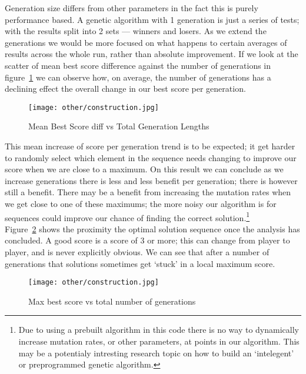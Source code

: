 Generation size differs from other parameters in the fact this is purely performance based.
A genetic algorithm with 1 generation is just a series of tests; with the results split into 2 sets --- winners and losers.
As we extend the generations we would be more focused on what happens to certain averages of results across the whole run, rather than absolute improvement.
If we look at the scatter of mean best score difference against the number of generations in figure~\ref{fig:GENS-mean-bs-diff-v-gens-all} we can observe how, on average, the number of generations has a declining effect the overall change in our best score per generation.\\ 

\begin{figure}
    \texttt{[image: other/construction.jpg]}
    \caption{Mean Best Score diff vs Total Generation Lengths}\label{fig:GENS-mean-bs-diff-v-gens-all}
\end{figure}

This mean increase of score per generation trend is to be expected; it get harder to randomly select which element in the sequence needs changing to improve our score when we are close to a maximum.
On this result we can conclude as we increase generations there is less and less benefit per generation; there is however still a benefit.
There may be a benefit from increasing the mutation rates when we get close to one of these maximums; the more noisy our algorithm is for sequences could improve our chance of finding the correct solution.\footnote{Due to using a prebuilt algorithm in this code there is no way to dynamically increase mutation rates, or other parameters, at points in our algorithm. This may be a potentialy intresting research topic on how to build an `intelegent' or preprogrammed genetic algorithm.}\\ 

Figure~\ref{fig:GENS-max-bs-v-gens-all} shows the proximity the optimal solution sequence once the analysis has concluded.
A good score is a score of 3 or more; this can change from player to player, and is never explicitly obvious.
We can see that after a number of generations that solutions sometimes get `stuck' in a local maximum score.

\begin{figure}
    \texttt{[image: other/construction.jpg]}
    \caption{Max best score vs total number of generations}\label{fig:GENS-max-bs-v-gens-all}
\end{figure}

